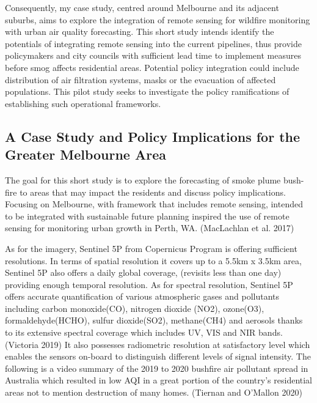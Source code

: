 \documentclass[
  letterpaper,
  DIV=11,
  numbers=noendperiod]{scrreprt}
\begin{document}
Consequently, my case study, centred around Melbourne and its adjacent
suburbs, aims to explore the integration of remote sensing for wildfire
monitoring with urban air quality forecasting. This short study intends
identify the potentials of integrating remote sensing into the current
pipelines, thus provide policymakers and city councils with sufficient
lead time to implement measures before smog affects residential areas.
Potential policy integration could include distribution of air
filtration systems, masks or the evacuation of affected populations.
This pilot study seeks to investigate the policy ramifications of
establishing such operational frameworks.

\hypertarget{a-case-study-and-policy-implications-for-the-greater-melbourne-area}{%
\subsection*{A Case Study and Policy Implications for the Greater
Melbourne
Area}\label{a-case-study-and-policy-implications-for-the-greater-melbourne-area}}

The goal for this short study is to explore the forecasting of smoke
plume bush-fire to areas that may impact the residents and discuss
policy implications. Focusing on Melbourne, with framework that includes
remote sensing, intended to be integrated with sustainable future
planning inspired the use of remote sensing for monitoring urban growth
in Perth, WA. (MacLachlan et al. 2017)

As for the imagery, Sentinel 5P from Copernicus Program is offering
sufficient resolutions. In terms of spatial resolution it covers up to a
5.5km x 3.5km area, Sentinel 5P also offers a daily global coverage,
(revisits less than one day) providing enough temporal resolution. As
for spectral resolution, Sentinel 5P offers accurate quantification of
various atmospheric gases and pollutants including carbon monoxide(CO),
nitrogen dioxide (NO2), ozone(O3), formaldehyde(HCHO), sulfur
dioxide(SO2), methane(CH4) and aerosols thanks to its extensive spectral
coverage which includes UV, VIS and NIR bands.(Victoria 2019) It also
possesses radiometric resolution at satisfactory level which enables the
sensors on-board to distinguish different levels of signal intensity.
The following is a video summary of the 2019 to 2020 bushfire air
pollutant spread in Australia which resulted in low AQI in a great
portion of the country's residential areas not to mention destruction of
many homes. (Tiernan and O'Mallon 2020)
\end{document}
